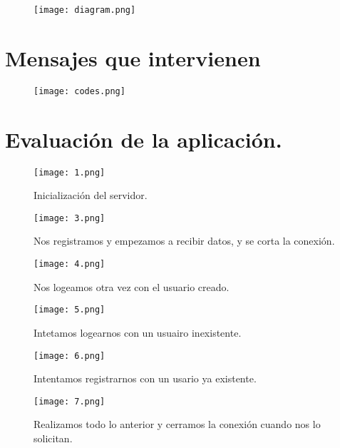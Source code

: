 \documentclass[a4paper, 11pt]{article}
\begin{document}
\begin{figure}[h]
\center
\texttt{[image: diagram.png]}
\end{figure}
\newpage
\section{Mensajes que intervienen}
\begin{figure}[h]
\center
\texttt{[image: codes.png]}
\end{figure}
\newpage
\section{Evaluación de la aplicación.}

\begin{figure}[h]
\center
\texttt{[image: 1.png]}
\caption{Inicialización del servidor.}
\texttt{[image: 3.png]}
\caption{Nos registramos y empezamos a recibir datos, y se corta la conexión.}
\texttt{[image: 4.png]}
\caption{Nos logeamos otra vez con el usuario creado.}
\end{figure}
\newpage
\begin{figure}[h]
\center
\texttt{[image: 5.png]}
\caption{Intetamos logearnos con un usuairo inexistente.}
\texttt{[image: 6.png]}
\caption{Intentamos registrarnos con un usario ya existente.}
\texttt{[image: 7.png]}
\caption{Realizamos todo lo anterior y cerramos la conexión cuando nos lo solicitan.}
\end{figure}
\end{document}
